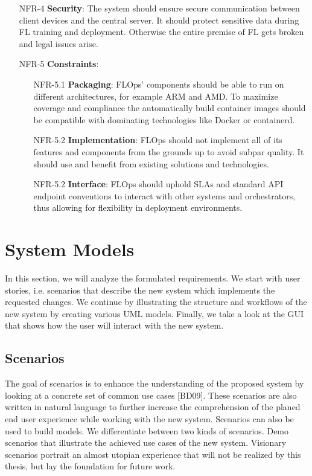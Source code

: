 \begin{itemize}
    \item [NFR-4] {\textbf{Security}}:
        The system should ensure secure communication between client devices and the central server.
        It should protect sensitive data during FL training and deployment.
        Otherwise the entire premise of FL gets broken and legal issues arise.
    \item [NFR-5] {\textbf{Constraints}}:
        \begin{itemize}
            \item [NFR-5.1] {\textbf{Packaging}}:
                FLOps' components should be able to run on different architectures, for example ARM and AMD.
                To maximize coverage and compliance the automatically build container images should be compatible with dominating technologies like Docker or containerd.
            \item [NFR-5.2] {\textbf{Implementation}}:
                FLOps should not implement all of its features and components from the grounds up to avoid subpar quality.
                It should use and benefit from existing solutions and technologies.
            \item [NFR-5.2] {\textbf{Interface}}:
                FLOps should uphold SLAs and standard API endpoint conventions to interact with other systems and orchestrators, thus allowing for flexibility in deployment environments.
        \end{itemize}
\end{itemize}




\section{System Models}

In this section, we will analyze the formulated requirements. We start with user stories, i.e. scenarios that describe the new system which implements the requested changes.
We continue by illustrating the structure and workflows of the new system by creating various UML models.
Finally, we take a look at the GUI that shows how the user will interact with the new system.

\subsection{Scenarios}

The goal of scenarios is to enhance the understanding of the proposed system by looking at a concrete set of common use cases [BD09].
These scenarios are also written in natural language to further increase the comprehension of the planed end user experience while working with the new system.
Scenarios can also be used to build models. We differentiate between two kinds of scenarios.
Demo scenarios that illustrate the achieved use cases of the new system.
Visionary scenarios portrait an almost utopian experience that will not be realized by this thesis, but lay the foundation for future work.

